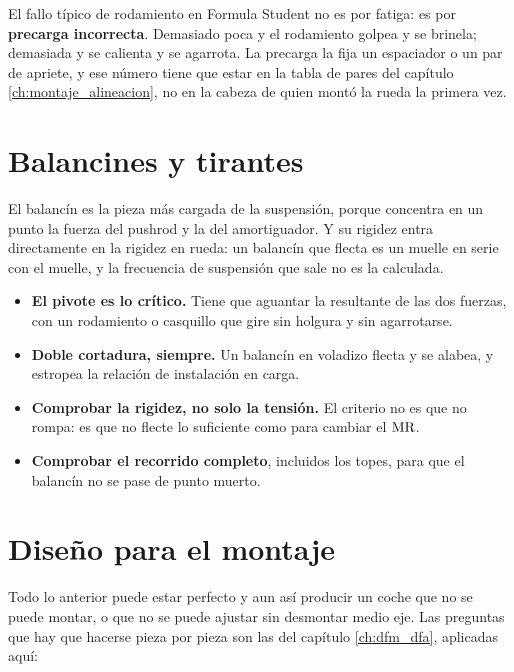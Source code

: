 \begin{clave}
El fallo típico de rodamiento en Formula Student no es por fatiga: es por
\textbf{precarga incorrecta}. Demasiado poca y el rodamiento golpea y se
brinela; demasiada y se calienta y se agarrota. La precarga la fija un
espaciador o un par de apriete, y ese número tiene que estar en la tabla de
pares del capítulo \ref{ch:montaje_alineacion}, no en la cabeza de quien montó
la rueda la primera vez.
\end{clave}

\section{Balancines y tirantes}
\label{sec:componentes_suspension:05}

El balancín es la pieza más cargada de la suspensión, porque concentra en un
punto la fuerza del pushrod y la del amortiguador. Y su rigidez entra
directamente en la rigidez en rueda: un balancín que flecta es un muelle en
serie con el muelle, y la frecuencia de suspensión que sale no es la calculada.

\begin{itemize}
  \item \textbf{El pivote es lo crítico.} Tiene que aguantar la resultante de las
        dos fuerzas, con un rodamiento o casquillo que gire sin holgura y sin
        agarrotarse.
  \item \textbf{Doble cortadura, siempre.} Un balancín en voladizo flecta y se
        alabea, y estropea la relación de instalación en carga.
  \item \textbf{Comprobar la rigidez, no solo la tensión.} El criterio no es que
        no rompa: es que no flecte lo suficiente como para cambiar el $\mathrm{MR}$.
  \item \textbf{Comprobar el recorrido completo}, incluidos los topes, para que
        el balancín no se pase de punto muerto.
\end{itemize}

\section{Diseño para el montaje}
\label{sec:componentes_suspension:06}

Todo lo anterior puede estar perfecto y aun así producir un coche que no se
puede montar, o que no se puede ajustar sin desmontar medio eje. Las preguntas
que hay que hacerse pieza por pieza son las del capítulo \ref{ch:dfm_dfa},
aplicadas aquí:


